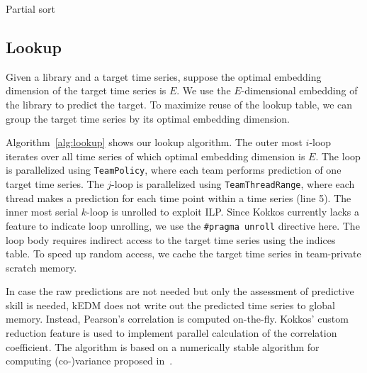 \documentclass[sigconf]{acmart}
\begin{document}
\begin{algorithm}
    \SetAlgoLined
    \DontPrintSemicolon
    \caption{Partial sort}%
    \label{alg:partial-sort}
\end{algorithm}

\subsection{Lookup}

Given a library and a target time series, suppose the optimal embedding
dimension of the target time series is $E$. We use the $E$-dimensional embedding
of the library to predict the target. To maximize reuse of the lookup table, we
can group the target time series by its optimal embedding dimension.

Algorithm~\ref{alg:lookup} shows our lookup algorithm. The outer most $i$-loop
iterates over all time series of which optimal embedding dimension is $E$. The loop is
parallelized using \texttt{TeamPolicy}, where each team performs prediction of one
target time series. The $j$-loop is parallelized using \texttt{TeamThreadRange},
where each thread makes a prediction for each time point within a time series (line 5). The
inner most serial $k$-loop is unrolled to exploit ILP\@. Since Kokkos currently
lacks a feature to indicate loop unrolling, we use the \texttt{\#pragma
unroll} directive here. The loop body requires indirect access to the target
time series using the indices table. To speed up random access, we cache the
target time series in team-private scratch memory.

In case the raw predictions are not needed but only the assessment of
predictive skill is needed, kEDM does not write out the predicted time series
to global memory. Instead, Pearson’s correlation is computed on-the-fly.
Kokkos’ custom reduction feature is used to implement parallel calculation of the
correlation coefficient. The algorithm is based on a numerically stable
algorithm for computing (co-)variance proposed in~\cite{Schubert2018}.
\end{document}
